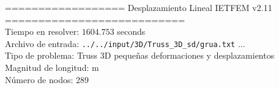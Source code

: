 \documentclass[a4paper,11pt]{article}
\begin{document}

================== Desplazamiento Lineal IETFEM v2.11 ===========================\\


Tiempo en resolver: $1604.753$ seconds \\

Archivo de entrada: \verb|../../input/3D/Truss_3D_sd/grua.txt|  ... \\

Tipo de problema: Truss 3D pequeñas deformaciones y desplazamientos\\ 

Magnitud de longitud: m \\

Número de nodos: 289 \\

\newpage       
\end{document}
